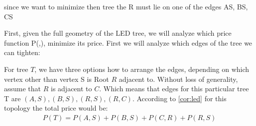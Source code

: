 \documentclass[12pt]{book}
\newcommand{\Price}[2]{P(#1,#2)}
\newcommand{\Ptotal}[1]{P(#1)}
\begin{document}
	since we want to minimize then tree the R must lie on one of the edges AS, BS, CS 
	
	
	
	
	
	First, given the full geometry of the LED tree, we will analyze which price function \Price{}{}, minimize its price.
	First we will analyze which edges of the tree we can tighten:
	
	For tree \( T \), we have three options how to arrange the edges, depending on which vertex other than vertex S is Root \( R \) adjacent to. Without loss of generality, assume that \(R\) is adjacent to \(C\). Which means that edges for this particular tree T are \((A,S),(B,S),(R,S),(R,C)\). According to  \cref{cor:led} for this topology the total price would be:
	 \begin{align*}
	 	\Ptotal{T} = \Price{A}{S} + \Price{B}{S} + \Price{C}{R} + \Price{R}{S}
	 \end{align*}
	 
\end{document}
